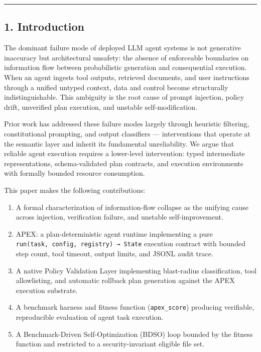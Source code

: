 \documentclass[
]{article}
\providecommand{\tightlist}{%
  \setlength{\itemsep}{0pt}\setlength{\parskip}{0pt}}
\begin{document}
\begin{center}\rule{0.5\linewidth}{0.5pt}\end{center}

\subsection{1. Introduction}\label{1-introduction}

The dominant failure mode of deployed LLM agent systems is not
generative inaccuracy but architectural unsafety: the absence of
enforceable boundaries on information flow between probabilistic
generation and consequential execution. When an agent ingests tool
outputs, retrieved documents, and user instructions through a unified
untyped context, data and control become structurally indistinguishable.
This ambiguity is the root cause of prompt injection, policy drift,
unverified plan execution, and unstable self-modification.

Prior work has addressed these failure modes largely through heuristic
filtering, constitutional prompting, and output classifiers ---
interventions that operate at the semantic layer and inherit its
fundamental unreliability. We argue that reliable agent execution
requires a lower-level intervention: typed intermediate representations,
schema-validated plan contracts, and execution environments with
formally bounded resource consumption.

This paper makes the following contributions:

\begin{enumerate}
\def\labelenumi{\arabic{enumi}.}
\tightlist
\item
  A formal characterization of information-flow collapse as the unifying
  cause across injection, verification failure, and unstable
  self-improvement.
\item
  APEX: a plan-deterministic agent runtime implementing a pure
  \texttt{run(task,\ config,\ registry)\ →\ State} execution contract
  with bounded step count, tool timeout, output limits, and JSONL audit
  trace.
\item
  A native Policy Validation Layer implementing blast-radius
  classification, tool allowlisting, and automatic rollback plan
  generation against the APEX execution substrate.
\item
  A benchmark harness and fitness function (\texttt{apex\_score})
  producing verifiable, reproducible evaluation of agent task execution.
\item
  A Benchmark-Driven Self-Optimization (BDSO) loop bounded by the
  fitness function and restricted to a security-invariant eligible file
  set.
\end{enumerate}
\end{document}
